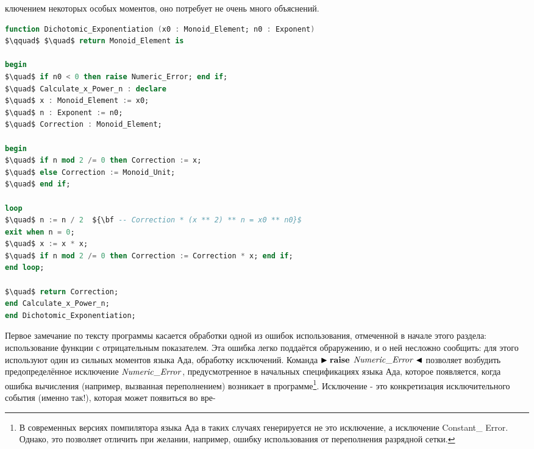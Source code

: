 


%

\noindent ключением некоторых особых моментов, оно потребует не очень много объяснений.
\begin{lstlisting}[mathescape=true, language=Ada, basicstyle=\small]
function Dichotomic_Exponentiation (x0 : Monoid_Element; n0 : Exponent)
$\qquad$ $\quad$ return Monoid_Element is

begin
$\quad$ if n0 < 0 then raise Numeric_Error; end if;
$\quad$ Calculate_x_Power_n : declare
$\quad$ x : Monoid_Element := x0;
$\quad$ n : Exponent := n0;
$\quad$ Correction : Monoid_Element;

begin
$\quad$ if n mod 2 /= 0 then Correction := x;
$\quad$ else Correction := Monoid_Unit;
$\quad$ end if;

loop
$\quad$ n := n / 2  ${\bf -- Correction * (x ** 2) ** n = x0 ** n0}$
exit when n = 0;
$\quad$ x := x * x;
$\quad$ if n mod 2 /= 0 then Correction := Correction * x; end if;
end loop;

$\quad$ return Correction;
end Calculate_x_Power_n;
end Dichotomic_Exponentiation;

\end{lstlisting}
 
 \par Первое замечание по тексту программы касается обработки одной из ошибок использования, отмеченной в начале этого раздела: использование функции с отрицательным показателем. Эта ошибка легко поддаётся обраружению, и о ней несложно сообщить: для этого используют один из сильных моментов языка Ада, обработку исключений. Команда $\blacktriangleright {\bf raise}$ \linebreak ${\it Numeric\_Error} \blacktriangleleft$ позволяет возбудить предопределённое исключение \linebreak ${\it Numeric\_ Error}$, предусмотренное в начальных спецификациях языка Ада, которое появляется, когда ошибка вычисления (например, вызванная переполнением) возникает в программе\footnote{В современных версиях помпилятора языка Ада в таких случаях генерируется не это исключение, а исключение Constant\_ Error. Однако, это позволяет отличить при желании, например, ошибку использования от переполнения разрядной сетки.}. Исключение - это конкретизация исключительного события (именно так!), которая может появиться во вре- \linebreak
 \newpage
 

